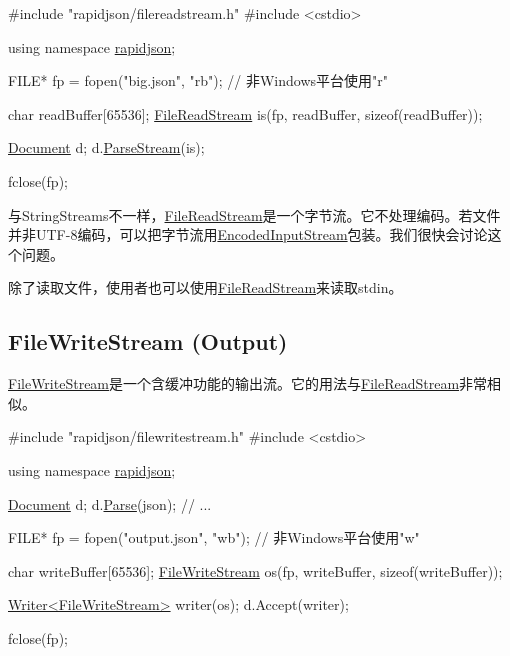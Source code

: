 \begin{DoxyCode}
\textcolor{preprocessor}{#include "rapidjson/filereadstream.h"}
\textcolor{preprocessor}{#include <cstdio>}

\textcolor{keyword}{using namespace }\hyperlink{namespacerapidjson}{rapidjson};

FILE* fp = fopen(\textcolor{stringliteral}{"big.json"}, \textcolor{stringliteral}{"rb"}); \textcolor{comment}{// 非Windows平台使用"r"}

\textcolor{keywordtype}{char} readBuffer[65536];
\hyperlink{class_file_read_stream}{FileReadStream} is(fp, readBuffer, \textcolor{keyword}{sizeof}(readBuffer));

\hyperlink{class_generic_document}{Document} d;
d.\hyperlink{class_generic_document_afe94c0abc83a20f2d7dc1ba7677e6238}{ParseStream}(is);

fclose(fp);
\end{DoxyCode}


与{\ttfamily String\+Streams}不一样，{\ttfamily \hyperlink{class_file_read_stream}{File\+Read\+Stream}}是一个字节流。它不处理编码。若文件并非\+U\+T\+F-\/8编码，可以把字节流用{\ttfamily \hyperlink{class_encoded_input_stream}{Encoded\+Input\+Stream}}包装。我们很快会讨论这个问题。

除了读取文件，使用者也可以使用{\ttfamily \hyperlink{class_file_read_stream}{File\+Read\+Stream}}来读取{\ttfamily stdin}。\hypertarget{md_Cadriciel_Commun_Externe_RapidJSON_doc_stream.zh-cn_FileWriteStream}{}\subsection{File\+Write\+Stream (\+Output)}\label{md_Cadriciel_Commun_Externe_RapidJSON_doc_stream.zh-cn_FileWriteStream}
{\ttfamily \hyperlink{class_file_write_stream}{File\+Write\+Stream}}是一个含缓冲功能的输出流。它的用法与{\ttfamily \hyperlink{class_file_read_stream}{File\+Read\+Stream}}非常相似。


\begin{DoxyCode}
\textcolor{preprocessor}{#include "rapidjson/filewritestream.h"}
\textcolor{preprocessor}{#include <cstdio>}

\textcolor{keyword}{using namespace }\hyperlink{namespacerapidjson}{rapidjson};

\hyperlink{class_generic_document}{Document} d;
d.\hyperlink{class_generic_document_aebd4e7fddd80c1e1174837aee6d2159b}{Parse}(json);
\textcolor{comment}{// ...}

FILE* fp = fopen(\textcolor{stringliteral}{"output.json"}, \textcolor{stringliteral}{"wb"}); \textcolor{comment}{// 非Windows平台使用"w"}

\textcolor{keywordtype}{char} writeBuffer[65536];
\hyperlink{class_file_write_stream}{FileWriteStream} os(fp, writeBuffer, \textcolor{keyword}{sizeof}(writeBuffer));

\hyperlink{class_writer}{Writer<FileWriteStream>} writer(os);
d.Accept(writer);

fclose(fp);
\end{DoxyCode}


